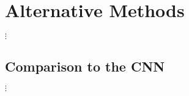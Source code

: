 \chapter{Alternative Methods}
\label{cha:alternative_methods}

$\vdots$

\section{Comparison to the CNN}
\label{sec:comparison}

$\vdots$
